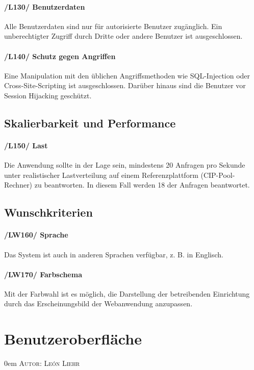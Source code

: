 \documentclass{article}
\makeatletter
\newcommand{\sectionauthor}[1]{
	{\parindent 0em \large \scshape Autor: #1 \par \nobreak \vspace*{2em}}
	\@afterheading
}
\makeatother
\begin{document}
    \paragraph{/L130/ \label{L130} Benutzerdaten}
   Alle Benutzerdaten sind nur für autorisierte Benutzer zugänglich.
Ein unberechtigter Zugriff durch Dritte oder andere Benutzer ist ausgeschlossen.

    \paragraph{/L140/ \label{L140} Schutz gegen Angriffen} 
   Eine Manipulation mit den üblichen Angriffsmethoden wie SQL-Injection oder Cross-Site-Scripting ist ausgeschlossen. Darüber hinaus sind die Benutzer vor Session Hijacking geschützt.
   
 \subsection{Skalierbarkeit und Performance}
	        \paragraph{
	        /L150/ \label{L150} Last}
	       Die Anwendung sollte in der Lage sein, mindestens 20 Anfragen pro Sekunde unter realistischer Lastverteilung auf einem Referenzplattform (CIP-Pool-Rechner) zu beantworten. In diesem Fall werden 18 der Anfragen beantwortet.
	       
	
\subsection{Wunschkriterien}
	    \paragraph{/LW160/ \label{LW160} Sprache}
	    Das System ist auch in anderen Sprachen verfügbar, z. B. in Englisch.
	    
\paragraph{/LW170/ \label{LW170} Farbschema}	    	       
	       Mit der Farbwahl ist es möglich, die Darstellung der betreibenden Einrichtung durch das Erscheinungsbild der Webanwendung anzupassen.
\newpage

\section{Benutzeroberfläche} %
\sectionauthor{León Liehr}
\end{document}
